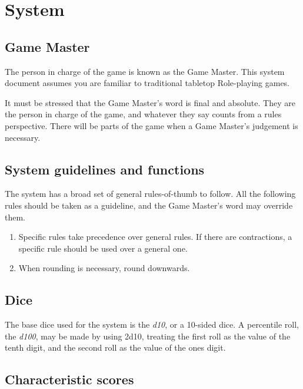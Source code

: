 \documentclass[]{article}
\date{}
\begin{document}
\section{System}\label{system}

\subsection{Game Master}\label{game-master}

The person in charge of the game is known as the Game Master. This
system document assumes you are familiar to traditional tabletop
Role-playing games.

It must be stressed that the Game Master's word is final and absolute.
They are the person in charge of the game, and whatever they say counts
from a rules perspective. There will be parts of the game when a Game
Master's judgement is necessary.

\subsection{System guidelines and
functions}\label{system-guidelines-and-functions}

The system has a broad set of general rules-of-thumb to follow. All the
following rules should be taken as a guideline, and the Game Master's
word may override them.

\begin{enumerate}
\def\labelenumi{\arabic{enumi}.}
\item
  Specific rules take precedence over general rules. If there are
  contractions, a specific rule should be used over a general one.
\item
  When rounding is necessary, round downwards.
\end{enumerate}

\subsection{Dice}\label{dice}

The base dice used for the system is the \emph{d10}, or a 10-sided dice.
A percentile roll, the \emph{d100}, may be made by using 2d10, treating
the first roll as the value of the tenth digit, and the second roll as
the value of the ones digit.

\subsection{Characteristic scores}\label{characteristic-scores}
\end{document}
